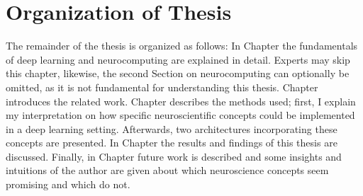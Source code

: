 \section{Organization of Thesis}
The remainder of the thesis is organized as follows: In Chapter  the fundamentals of deep learning and neurocomputing are explained in detail.
Experts may skip this chapter, likewise, the second Section on neurocomputing can optionally be omitted, as it is not fundamental for understanding this thesis.
Chapter  introduces the related work. Chapter  describes the methods used; first, I explain my interpretation on how specific neuroscientific concepts could be implemented in a deep learning setting. Afterwards, two architectures incorporating these concepts are presented. In Chapter  the results and findings of this thesis are discussed. Finally, in Chapter  future work is described and some insights and intuitions of the author are given about which neuroscience concepts seem promising and which do not.


